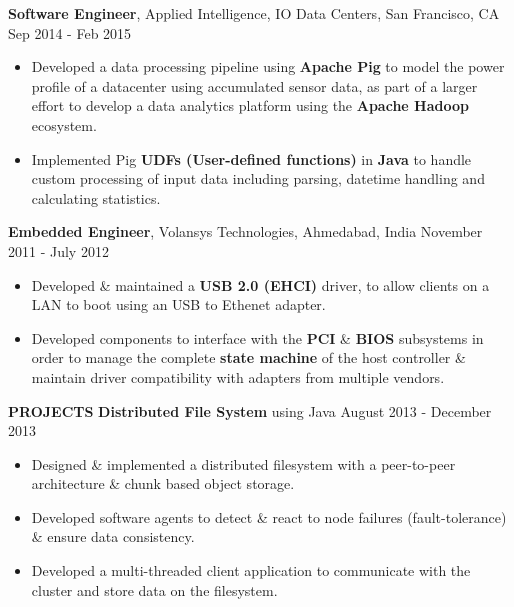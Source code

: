 \documentclass[10pt, letterpaper]{article}
\begin{document}
\textbf{Software Engineer}, Applied Intelligence, IO Data Centers, San Francisco, CA \hfill Sep 2014 - Feb 2015
\begin{itemize}
    \item Developed a data processing pipeline using \textbf{Apache Pig} to model 
the power profile of a datacenter using accumulated sensor data, as part of a larger effort to develop a data analytics
platform using the \textbf{Apache Hadoop} ecosystem.
    \item Implemented Pig \textbf{UDFs (User-defined functions)} in \textbf{Java} to handle custom processing of input data including parsing, datetime handling and
calculating statistics.
\end{itemize}

\textbf{Embedded Engineer}, Volansys Technologies, Ahmedabad, India \hfill November 2011 - July 2012
\begin{itemize}
    \item Developed \& maintained a \textbf{USB 2.0 (EHCI)} driver, to allow 
clients on a LAN to boot using an USB to Ethenet adapter.
    \item Developed components to interface with the \textbf{PCI} \& \textbf{BIOS} 
subsystems in order to manage the complete \textbf{state machine} of the host controller
\& maintain driver compatibility with adapters from multiple vendors. 
\end{itemize}

\textbf{PROJECTS}
\smallskip 
\newline
\textbf{Distributed File System} using Java \hfill August 2013 - December 2013
\begin{itemize}
    \item Designed \& implemented a distributed filesystem with a peer-to-peer 
architecture \& chunk based object storage.
    \item Developed software agents to detect \& react to node failures (fault-tolerance) \& ensure data consistency.
    \item Developed a multi-threaded client application to communicate with the cluster and store data on the filesystem.
\end{itemize}
\end{document}
